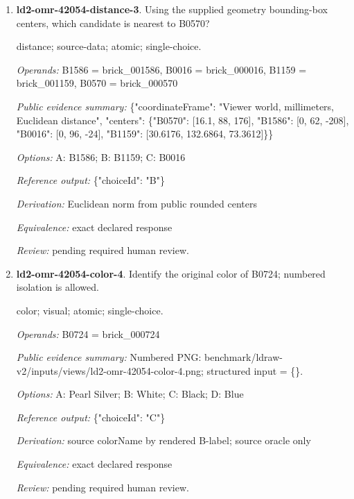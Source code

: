 \begin{enumerate}
\par{\small shape-match; visual; atomic; single-choice.\par\textit{Operands:} B1867 = brick\_001867, B0570 = brick\_000570, B1885 = brick\_001885, B0803 = brick\_000803, B1394 = brick\_001394\par\textit{Public evidence summary:} Numbered PNG: benchmark/ldraw-v2/inputs/views/ld2-omr-42054-shape-match-3.png; structured input = \{\}.\par\textit{Options:} A: B1867; B: B1394; C: B0803; D: B1885\par\textit{Reference output:} \{"choiceId": "B"\}\par\textit{Derivation:} source partNumber equality across labeled candidates; source oracle only\par\textit{Equivalence:} same source partNumber; ignore color and pose; perceptual equivalence pending\par\textit{Review:} pending required human review.}
\item \textbf{ld2-omr-42054-distance-3}. Using the supplied geometry bounding-box centers, which candidate is nearest to B0570?
\par{\small distance; source-data; atomic; single-choice.\par\textit{Operands:} B1586 = brick\_001586, B0016 = brick\_000016, B1159 = brick\_001159, B0570 = brick\_000570\par\textit{Public evidence summary:} \{"coordinateFrame": "Viewer world, millimeters, Euclidean distance", "centers": \{"B0570": [16.1, 88, 176], "B1586": [0, 62, -208], "B0016": [0, 96, -24], "B1159": [30.6176, 132.6864, 73.3612]\}\}\par\textit{Options:} A: B1586; B: B1159; C: B0016\par\textit{Reference output:} \{"choiceId": "B"\}\par\textit{Derivation:} Euclidean norm from public rounded centers\par\textit{Equivalence:} exact declared response\par\textit{Review:} pending required human review.}
\item \textbf{ld2-omr-42054-color-4}. Identify the original color of B0724; numbered isolation is allowed.
\par{\small color; visual; atomic; single-choice.\par\textit{Operands:} B0724 = brick\_000724\par\textit{Public evidence summary:} Numbered PNG: benchmark/ldraw-v2/inputs/views/ld2-omr-42054-color-4.png; structured input = \{\}.\par\textit{Options:} A: Pearl Silver; B: White; C: Black; D: Blue\par\textit{Reference output:} \{"choiceId": "C"\}\par\textit{Derivation:} source colorName by rendered B-label; source oracle only\par\textit{Equivalence:} exact declared response\par\textit{Review:} pending required human review.}

\end{enumerate}
